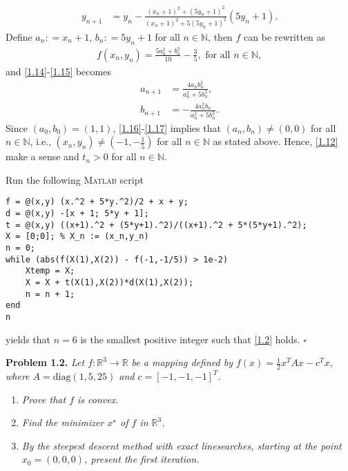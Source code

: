 \documentclass[a4paper]{article}
\numberwithin{equation}{section}
\begin{document}
\begin{enumerate}
\begin{align}
{y_{n + 1}} &= {y_n} - \frac{{{{\left( {{x_n} + 1} \right)}^2} + {{\left( {5{y_n} + 1} \right)}^2}}}{{{{\left( {{x_n} + 1} \right)}^2} + 5{{\left( {5{y_n} + 1} \right)}^2}}}\left( {5{y_n} + 1} \right). \label{1.15}
\end{align}
Define ${a_n}: = {x_n} + 1$, ${b_n}: = 5{y_n} + 1$ for all $n\in \mathbb{N}$, then $f$ can be rewritten as 
\begin{align}
f\left( {{x_n},{y_n}} \right) = \frac{{5a_n^2 + b_n^2}}{{10}} - \frac{3}{5},\mbox{ for all } n \in \mathbb{N},
\end{align}
and \eqref{1.14}-\eqref{1.15} becomes
\begin{align}
\label{1.16}
{a_{n + 1}} &= \frac{{4{a_n}b_n^2}}{{a_n^2 + 5b_n^2}},\\
{b_{n + 1}} &=  - \frac{{4a_n^2{b_n}}}{{a_n^2 + 5b_n^2}}. \label{1.17}
\end{align}
Since $\left(a_0,b_0\right)=\left(1,1\right)$, \eqref{1.16}-\eqref{1.17} implies that $\left(a_n,b_n\right) \ne \left(0,0\right)$ for all $n\in \mathbb{N}$, i.e., $\left( {{x_n},{y_n}} \right) \ne \left( { - 1, - \frac{1}{5}} \right)$ for all $n\in \mathbb{N}$ as stated above. Hence, \eqref{1.12} make a sense and $t_n>0$ for all $n\in \mathbb{N}$.

Run the following \textsc{Matlab} script
\begin{verbatim}
f = @(x,y) (x.^2 + 5*y.^2)/2 + x + y;
d = @(x,y) -[x + 1; 5*y + 1];
t = @(x,y) ((x+1).^2 + (5*y+1).^2)/((x+1).^2 + 5*(5*y+1).^2);
X = [0;0]; % X_n := (x_n,y_n)
n = 0; 
while (abs(f(X(1),X(2)) - f(-1,-1/5)) > 1e-2)
    Xtemp = X;
    X = X + t(X(1),X(2))*d(X(1),X(2));
    n = n + 1;
end
n
\end{verbatim}
yields that $n=6$ is the smallest positive integer such that \eqref{1.2} holds. \hfill $\square$
\end{enumerate}
\textbf{Problem 1.2.} \textit{Let $f:\mathbb{R}^3\to \mathbb{R}$ be a mapping defined by $f\left( x \right) = \frac{1}{2}{x^T}Ax - {c^T}x$, where $A=\mbox{diag}\left(1,5,25\right)$ and $c=\left[-1, -1, -1\right]^T$.}
\begin{enumerate}
\item \textit{Prove that $f$ is convex.}
\item \textit{Find the minimizer $x^\star$ of $f$ in $\mathbb{R}^3$.}
\item \textit{By the steepest descent method with exact linesearches, starting at the point $x_0=\left(0,0,0\right)$, present the first iteration.}
\end{enumerate}
\end{document}
